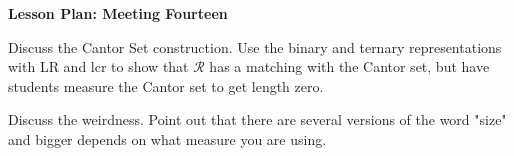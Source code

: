 \documentclass[12pt]{amsart}
\theoremstyle{definition}
\begin{document}
\begin{center}
\textbf{\Huge
Lesson Plan: Meeting Fourteen
}
\end{center}
\vspace{.5in}

Discuss the Cantor Set construction.
Use the binary and ternary representations with LR and lcr to show that $\mathcal{R}$ has a matching with the Cantor set, but have students measure the Cantor set to get length zero.

Discuss the weirdness.
Point out that there are several versions of the word "size" and bigger depends on what measure you are using.
\end{document}
